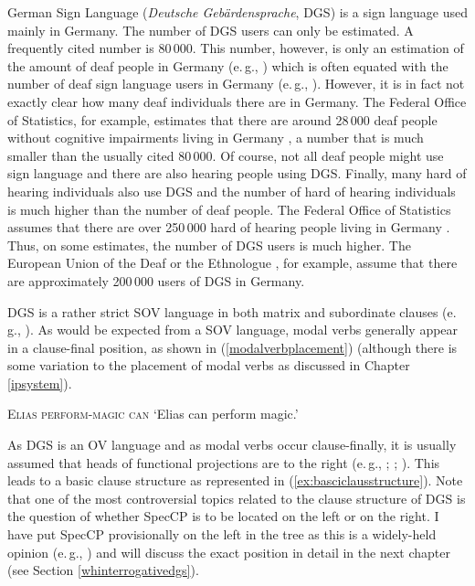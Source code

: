 German Sign Language (\textit{Deutsche Geb\"ardensprache}, DGS) is a sign language used mainly in Germany. The number of DGS users can only be estimated. A frequently cited number is 80\,000. This number, however, is only an estimation of the amount of deaf people in Germany (e.\,g., \citealt{dgb}) which is often equated with the number of deaf sign language users in Germany (e.\,g., \citealt{herrmann2007,schwagerzeshan2010}). However, it is in fact not exactly clear how many deaf individuals there are in Germany. The Federal Office of Statistics, for example, estimates that there are around 28\,000 deaf people without cognitive impairments living in Germany \citep{schwerbehindertenstatistik2017}, a number that is much smaller than the usually cited 80\,000. Of course, not all deaf people might use sign language and there are also hearing people using DGS. Finally, many hard of hearing individuals also use DGS and the number of hard of hearing individuals is much higher than the number of deaf people. The Federal Office of Statistics assumes that there are over 250\,000 hard of hearing people living in Germany \citep{schwerbehindertenstatistik2017}. Thus, on some estimates, the number of DGS users is much higher. The European Union of the Deaf \citep{eud2012} or the Ethnologue \citep{simons2018ethnologue}, for example, assume that there are approximately 200\,000 users of DGS in Germany.

DGS is a rather strict SOV language in both matrix and subordinate clauses (e.\,g., \citealt{keller1998aspekte, pfau2001pseudo}). As would be expected from a SOV language, modal verbs generally appear in a clause-final position, as shown in (\ref{modalverbplacement}) (although there is some variation to the placement of modal verbs as discussed in Chapter \ref{ipsystem}). 


\begin{exe}
\ex \textsc{Elias perform-magic can}
\glt `Elias can perform magic.'\label{modalverbplacement}
\end{exe}

\noindent As DGS is an OV language and as modal verbs occur clause-finally, it is usually assumed that heads of functional projections are to the right (e.\,g.,  \citealt[365]{sandler2006sign}; \citealt[17]{herrmann2013modal}; \citealt[3]{bross2017scope}). This leads to a basic clause structure as represented in (\ref{ex:basciclausstructure}). Note that one of the most controversial topics related to the clause structure of DGS is the question of whether SpecCP is to be located on the left or on the right. I have put SpecCP provisionally on the left in the tree as this is a widely-held opinion (e.\,g., \citealt{herrmann2013modal}) and will discuss the exact position in detail in the next chapter (see Section \ref{whinterrogativedgs}).

